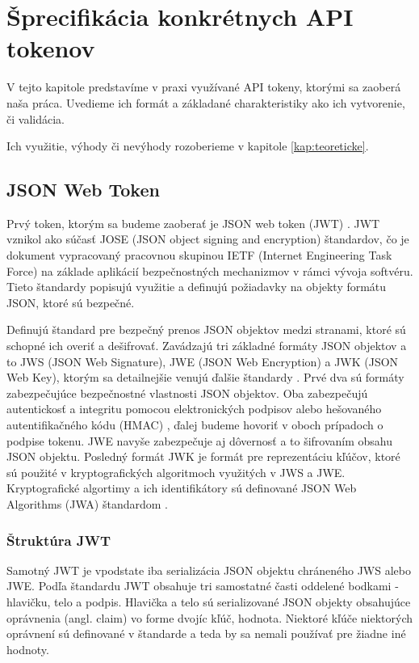 \chapter{Šprecifikácia konkrétnych API tokenov}

\label{kap:typy} %

V tejto kapitole predstavíme v praxi využívané API tokeny, ktorými sa zaoberá naša práca. Uvedieme ich formát a základané charakteristiky ako ich vytvorenie, či validácia.

Ich využitie, výhody či nevýhody rozoberieme v kapitole \ref{kap:teoreticke}.

\section{JSON Web Token}

Prvý token, ktorým sa budeme zaoberať je JSON web token (JWT) \cite{jwt_rfc}. JWT vznikol ako súčasť JOSE \cite{jose_rfc} (JSON object signing and encryption) štandardov, čo je dokument vypracovaný pracovnou skupinou IETF (Internet Engineering Task Force) na základe aplikácií bezpečnostných mechanizmov v rámci vývoja softvéru. Tieto štandardy popisujú využitie a definujú požiadavky na objekty formátu JSON, ktoré sú bezpečné.

Definujú štandard pre bezpečný prenos JSON objektov medzi stranami, ktoré sú schopné ich overiť a dešifrovať. Zavádzajú tri základné formáty JSON objektov a to JWS (JSON Web Signature), JWE (JSON Web Encryption) a JWK (JSON Web Key), ktorým sa detailnejšie venujú ďalšie štandardy \cite{jws_rfc, jwe_rfc, jwk_rfc}. Prvé dva sú formáty zabezpečujúce bezpečnostné vlastnosti JSON objektov. Oba zabezpečujú autentickosť a integritu pomocou elektronických podpisov alebo hešovaného autentifikačného kódu (HMAC) \cite{hmac}, ďalej budeme hovoriť v oboch prípadoch o podpise tokenu. JWE navyše zabezpečuje aj dôvernosť a to šifrovaním obsahu JSON objektu. Posledný formát JWK je formát pre reprezentáciu kľúčov, ktoré sú použité v kryptografických algoritmoch využitých v JWS a JWE. Kryptografické algortimy a ich identifikátory sú definované JSON
Web Algorithms (JWA) štandardom \cite{jwa_rfc}.

\subsection{Štruktúra JWT}

Samotný JWT je vpodstate iba serializácia JSON objektu chráneného JWS alebo JWE. Podľa štandardu JWT obsahuje tri samostatné časti oddelené bodkami - hlavičku, telo a podpis. Hlavička a telo sú serializované JSON objekty obsahujúce oprávnenia (angl. claim) vo forme dvojíc kľúč, hodnota. Niektoré kľúče niektorých oprávnení sú definované v štandarde a teda by sa nemali používať pre žiadne iné hodnoty. 

